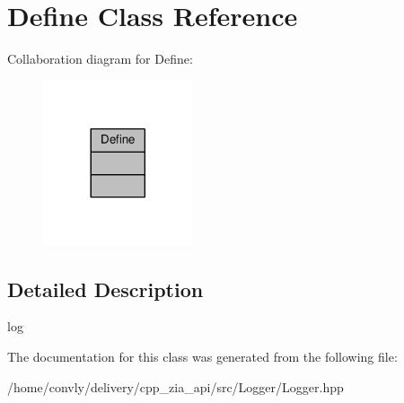 \hypertarget{classDefine}{}\section{Define Class Reference}
\label{classDefine}


Collaboration diagram for Define\+:
\nopagebreak
\begin{figure}[H]
\begin{center}
\leavevmode
\includegraphics[width=125pt]{classDefine__coll__graph}
\end{center}
\end{figure}


\subsection{Detailed Description}
log 

The documentation for this class was generated from the following file\+:\begin{DoxyCompactItemize}
\item 
/home/convly/delivery/cpp\+\_\+zia\+\_\+api/src/\+Logger/Logger.\+hpp\end{DoxyCompactItemize}
